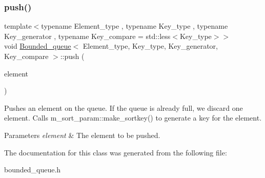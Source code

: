 \subsubsection{\texorpdfstring{push()}{push()}}
{\footnotesize\ttfamily template$<$typename Element\+\_\+type , typename Key\+\_\+type , typename Key\+\_\+generator , typename Key\+\_\+compare  = std\+::less$<$\+Key\+\_\+type$>$$>$ \\
void \mbox{\hyperlink{classBounded__queue}{Bounded\+\_\+queue}}$<$ Element\+\_\+type, Key\+\_\+type, Key\+\_\+generator, Key\+\_\+compare $>$\+::push (\begin{DoxyParamCaption}\item[{Element\+\_\+type}]{element }\end{DoxyParamCaption})\hspace{0.3cm}{\ttfamily [inline]}}

Pushes an element on the queue. If the queue is already full, we discard one element. Calls m\+\_\+sort\+\_\+param\+::make\+\_\+sortkey() to generate a key for the element.


\begin{DoxyParams}{Parameters}
{\em element} & The element to be pushed. \\
\hline
\end{DoxyParams}


The documentation for this class was generated from the following file\+:\begin{DoxyCompactItemize}
\item 
bounded\+\_\+queue.\+h\end{DoxyCompactItemize}
